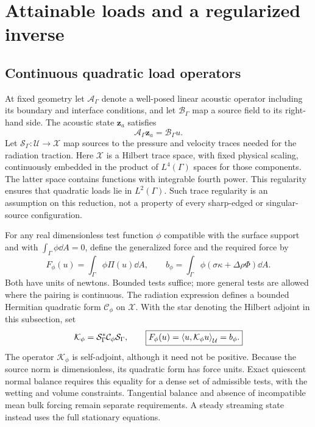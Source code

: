 \section{Attainable loads and a regularized inverse}\label{sec:reachability}

\subsection{Continuous quadratic load operators}
At fixed geometry let $\mathcal A_\Gamma$ denote a well-posed linear acoustic
operator including its boundary and interface conditions, and let
$\mathcal B_\Gamma$ map a source field to its right-hand side. The acoustic
state $\bm z_a$ satisfies
\begin{equation}
 \mathcal A_\Gamma\bm z_a=\mathcal B_\Gamma u.
 \label{eq:distributed-state}
\end{equation}
Let $\mathcal S_\Gamma:\mathcal U\to\mathcal X$ map sources to the pressure
and velocity traces needed for the radiation traction. Here $\mathcal X$ is
a Hilbert trace space, with fixed physical scaling, continuously embedded in
the product of $L^4(\Gamma)$ spaces for those components. The latter space
contains functions with integrable fourth power. This regularity ensures that
quadratic loads lie in $L^2(\Gamma)$. Such trace regularity is an assumption
on this reduction, not a property of every sharp-edged or singular-source
configuration.

For any real dimensionless test function $\phi$ compatible with the surface
support and with $\int_\Gamma\phi\dd A=0$, define the generalized force
and the required force by
\begin{equation}
 F_\phi(u)=\int_\Gamma\phi\Pi(u)\dd A,
 \qquad b_\phi=\int_\Gamma\phi(\sigma\kappa+\Delta\rho\Phi)\dd A.
 \label{eq:continuous-force}
\end{equation}
Both have units of newtons. Bounded tests suffice; more general tests are
allowed where the pairing is continuous. The radiation expression defines a
bounded Hermitian quadratic form $\mathcal C_\phi$ on $\mathcal X$. With
the star denoting the Hilbert adjoint in this subsection, set
\begin{equation}
 \mathcal K_\phi=\mathcal S_\Gamma^*\mathcal C_\phi\mathcal S_\Gamma,
 \qquad
 \boxed{F_\phi(u)=\left\langle u,\mathcal K_\phi u\right\rangle_{\mathcal U}=b_\phi.}
 \label{eq:continuous-quadratic}
\end{equation}
The operator $\mathcal K_\phi$ is self-adjoint, although it need not be
positive. Because the source norm is dimensionless, its quadratic form has
force units. Exact quiescent normal balance requires this equality for a
dense set of admissible tests, with the wetting and volume constraints.
Tangential balance and absence of incompatible mean bulk forcing remain
separate requirements. A steady streaming state instead uses the full
stationary equations.

